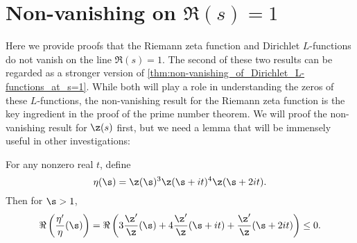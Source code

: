     \section{Non-vanishing on \texorpdfstring{$\Re(s) = 1$}{\Re(s) = 1}}
      Here we provide proofs that the Riemann zeta function and Dirichlet $L$-functions do not vanish on the line $\Re(s) = 1$. The second of these two results can be regarded as a stronger version of \cref{thm:non-vanishing_of_Dirichlet_L-functions_at_s=1}. While both will play a role in understanding the zeros of these $L$-functions, the non-vanishing result for the Riemann zeta function is the key ingredient in the proof of the prime number theorem. We will proof the non-vanishing result for $\z(s)$ first, but we need a lemma that will be immensely useful in other investigations:

      \begin{lemma}\label{lem:zero-free_region_zeta_lemma}
        For any nonzero real $t$, define
        \[
          \eta(\s) = \z(\s)^{3}\z(\s+it)^{4}\z(\s+2it). 
        \]
        Then for $\s > 1$,
        \[
          \Re\left(\frac{\eta'}{\eta}(\s)\right) = \Re\left(3\frac{\z'}{\z}(\s)+4\frac{\z'}{\z}(\s+it)+\frac{\z'}{\z}(\s+2it)\right) \le 0.
        \]
      \end{lemma}
